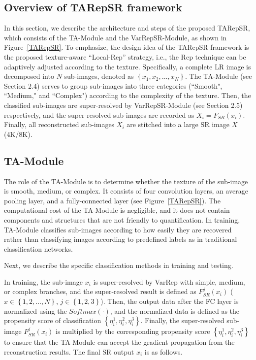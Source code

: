 \documentclass[sn-mathphys]{sn-jnl}%
\theoremstyle{thmstyleone}%
\theoremstyle{thmstyletwo}%
\theoremstyle{thmstylethree}%
\begin{document}
\subsection{Overview of TARepSR framework}
In this section, we describe the architecture and steps of the proposed TARepSR, which consists of the TA-Module and the VarRepSR-Module, as shown in Figure~\ref{TARepSR}. To emphasize, the design idea of the TARepSR framework is the proposed texture-aware ``Local-Rep'' strategy, i.e., the Rep technique can be adaptively adjusted according to the texture. Specifically, a complete LR image is decomposed into $N$ sub-images, denoted as $\left\{x_1, x_2, \ldots, x_N\right\}$. The TA-Module (see Section 2.4) serves to group sub-images into three categories (``Smooth", ``Medium," and ``Complex") according to the complexity of the texture. Then, the classified sub-images are super-resolved by VarRepSR-Module (see Section 2.5) respectively, and the super-resolved sub-images are recorded as $X_i=F_{S R}\left(x_i\right)$. Finally, all reconstructed sub-images $X_i$ are stitched into a large SR image $X$ (4K/8K).

\subsection{TA-Module}
The role of the TA-Module is to determine whether the texture of the sub-image is smooth, medium, or complex. It consists of four convolution layers, an average pooling layer, and a fully-connected layer (see Figure~\ref{TARepSR}). The computational cost of the TA-Module is negligible, and it does not contain components and structures that are not friendly to quantification. In training, TA-Module classifies sub-images according to how easily they are recovered rather than classifying images according to predefined labels as in traditional classification networks.

Next, we describe the specific classification methods in training and testing.

In training, the sub-image $x_i$ is super-resolved by VarRep with simple, medium, or complex branches, and the super-resolved result is defined as $F_{S R}^j\left(x_i\right)$ ($x \in \left\{1,2, \ldots, N\right\}$, $j \in \left\{1,2,3\right\}$). Then, the output data after the FC layer is normalized using the $Softmax(\cdot)$, and the normalized data is defined as the propensity score of classification $\left\{\eta_i^1, \eta_i^2, \eta_i^3\right\}$. Finally, the super-resolved sub-image $F_{S R}^j\left(x_i\right)$ is multiplied by the corresponding propensity score $\left\{\eta_i^1, \eta_i^2, \eta_i^3\right\}$ to ensure that the TA-Module can accept the gradient propagation from the reconstruction results. The final SR output $x_i$ is as follows.
\end{document}
